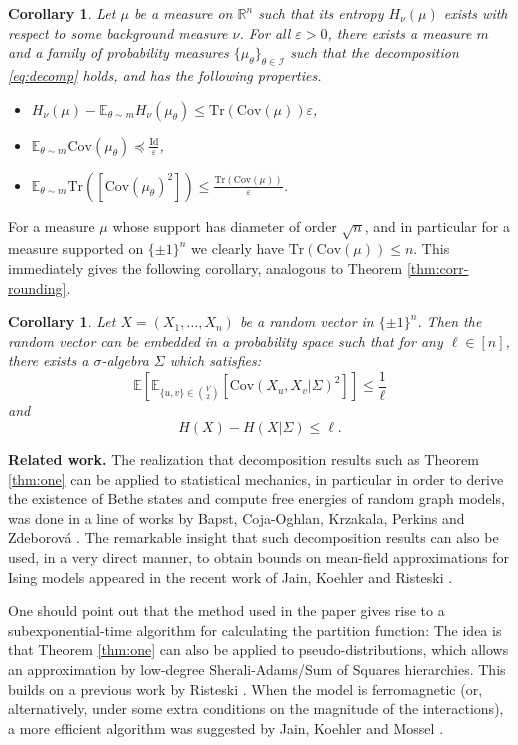 \documentclass[12pt]{article}
\def \RR {\mathbb R}
\def \Tr {\mathrm{Tr}}
\def \EE {\mathbb E}
\def \Cov {\mathrm {Cov}}
\def \eps {\varepsilon}
\def \Id {\mathrm{Id}}
\def \Cov {\mathrm{Cov}}
\newtheorem{corollary}[theorem]{Corollary}
\theoremstyle{definition}
\theoremstyle{remark}
\begin{document}
\begin{corollary}
Let $\mu$ be a measure on $\RR^n$ such that its entropy $H_\nu(\mu)$ exists with respect to some background measure $\nu$. For all $\eps>0$, there exists a  measure $m$ and a family of  probability measures $\{\mu_\theta \}_{\theta \in \mathcal{I}}$ such that the decomposition \eqref{eq:decomp} holds, and has the following properties.
\begin{itemize}
	\item $H_\nu(\mu) - \EE_{\theta \sim m} H_\nu(\mu_\theta) \leq \Tr(\Cov(\mu)) \eps$,
	\item $\EE_{\theta \sim m} \Cov(\mu_\theta) \preceq \frac{\Id}{\eps}$,
	\item $\EE_{\theta \sim m} \Tr( \left [\Cov(\mu_\theta)^2 \right ] ) \leq \frac{\Tr(\Cov(\mu))}{\eps}$.
\end{itemize} 
\end{corollary}
For a measure $\mu$ whose support has diameter of order $\sqrt{n}$, and in particular for a measure supported on $\{\pm 1\}^n$ we clearly have $\Tr(\Cov(\mu)) \leq n$. This immediately gives the following corollary, analogous to Theorem \ref{thm:corr-rounding}.
\begin{corollary} 
Let $X = (X_1,\dots, X_n)$ be a random vector in $\{\pm 1\}^n$. Then the random vector can be embedded in a probability space such that for any $\ell \in [n]$, there exists a $\sigma$-algebra $\Sigma$ which satisfies:
$$\EE \left [ \EE_{\{u,v\} \in {V \choose 2}}\left[\Cov(X_u,X_v | \Sigma )^2\right] \right ] \le \frac{1}{\ell}$$
and
$$
H(X) - H(X | \Sigma) \leq \ell.
$$
\end{corollary}

\noindent\textbf{Related work.} The realization that decomposition results such as Theorem \ref{thm:one} can be applied to statistical mechanics, in particular in order to derive the existence of Bethe states and compute free energies of random graph models, was done in a line of works by Bapst, Coja-Oghlan, Krzakala, Perkins and Zdeborov\'{a} \cite{BCO16,CKPZ16,CP17}. The remarkable insight that such decomposition results can also be used, in a very direct manner, to obtain bounds on mean-field approximations for Ising models appeared in the recent work of Jain, Koehler and Risteski \cite{JKR18}. 

One should point out that the method used in the paper \cite{JKR18} gives rise to a subexponential-time algorithm for calculating the partition function: The idea is that Theorem \ref{thm:one} can also be applied to pseudo-distributions, which allows an approximation by low-degree Sherali-Adams/Sum of Squares hierarchies. This builds on a previous work by Risteski \cite{pmlr-v49-risteski16}. When the model is ferromagnetic (or, alternatively, under some extra conditions on the magnitude of the interactions), a more efficient algorithm was suggested by Jain, Koehler and Mossel \cite{JKM17}.\\
\end{document}
